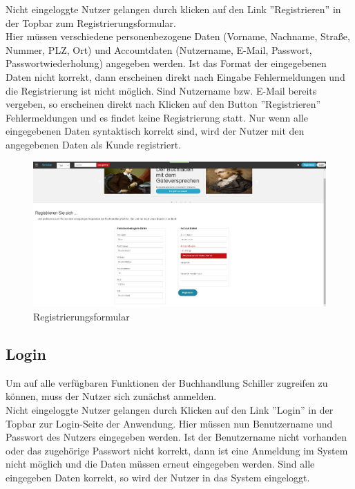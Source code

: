 \documentclass[a4paper]{article}
\begin{document}
Nicht eingeloggte Nutzer gelangen durch klicken auf den Link ''Registrieren'' in der Topbar zum Registrierungsformular. \\
Hier müssen verschiedene personenbezogene Daten (Vorname, Nachname, Straße, Nummer, PLZ, Ort) und Accountdaten (Nutzername, E-Mail, Passwort, Passwortwiederholung) angegeben werden. Ist das Format der eingegebenen Daten nicht korrekt, dann erscheinen direkt nach Eingabe Fehlermeldungen und die Registrierung ist nicht möglich. Sind Nutzername bzw. E-Mail bereits vergeben, so erscheinen direkt nach Klicken auf den Button ''Registrieren'' Fehlermeldungen und es findet keine Registrierung statt. Nur wenn alle eingegebenen Daten syntaktisch korrekt sind, wird der Nutzer mit den angegebenen Daten als Kunde registriert.

\begin{figure}[ht]
\centering
\includegraphics[width=1.0\textwidth]{Registrierung.jpg}
\caption{Registrierungsformular}
\end{figure}
\smallskip

\FloatBarrier

\subsection{Login}

Um auf alle verfügbaren Funktionen der Buchhandlung Schiller zugreifen zu können, muss der Nutzer sich zunächst anmelden. \\
Nicht eingeloggte Nutzer gelangen durch Klicken auf den Link ''Login'' in der Topbar zur Login-Seite der Anwendung. Hier müssen nun Benutzername und Passwort des Nutzers eingegeben werden. Ist der Benutzername nicht vorhanden oder das zugehörige Passwort nicht korrekt, dann ist eine Anmeldung im System nicht möglich und die Daten müssen erneut eingegeben werden. Sind alle eingegeben Daten korrekt, so wird der Nutzer in das System eingeloggt.
\end{document}
